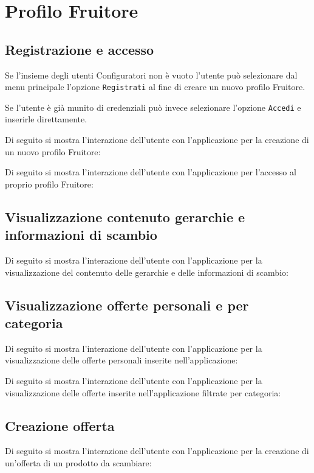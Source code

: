 \section{Profilo Fruitore}

\subsection{Registrazione e accesso}
Se l'insieme degli utenti Configuratori non è vuoto l'utente può selezionare dal menu principale l'opzione \texttt{Registrati} al fine di creare un nuovo profilo Fruitore. 

Se l'utente è già munito di credenziali può invece selezionare l'opzione \texttt{Accedi} e inserirle direttamente.

Di seguito si mostra l'interazione dell'utente con l'applicazione per la creazione di un nuovo profilo Fruitore:


Di seguito si mostra l'interazione dell'utente con l'applicazione per l'accesso al proprio profilo Fruitore:


\subsection{Visualizzazione contenuto gerarchie e informazioni di scambio}
Di seguito si mostra l'interazione dell'utente con l'applicazione per la visualizzazione del contenuto delle gerarchie e delle informazioni di scambio:


\subsection{Visualizzazione offerte personali e per categoria}
Di seguito si mostra l'interazione dell'utente con l'applicazione per la visualizzazione delle offerte personali inserite nell'applicazione:


Di seguito si mostra l'interazione dell'utente con l'applicazione per la visualizzazione delle offerte inserite nell'applicazione filtrate per categoria:
 

\subsection{Creazione offerta}
Di seguito si mostra l'interazione dell'utente con l'applicazione per la creazione di un'offerta di un prodotto da scambiare:


